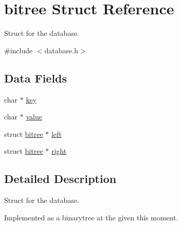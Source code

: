 \hypertarget{structbitree}{\section{bitree Struct Reference}
\label{structbitree}
}


Struct for the database.  




{\ttfamily \#include $<$database.\-h$>$}

\subsection*{Data Fields}
\begin{DoxyCompactItemize}
\item 
char $\ast$ \hyperlink{structbitree_a5892a9181e6a332f84d27aecd41dcd12}{key}
\item 
char $\ast$ \hyperlink{structbitree_a4e9aec275e566b978a3ccb4e043d8c61}{value}
\item 
struct \hyperlink{structbitree}{bitree} $\ast$ \hyperlink{structbitree_a18d65ac734ef7c9a47acebcc1bd95a99}{left}
\item 
struct \hyperlink{structbitree}{bitree} $\ast$ \hyperlink{structbitree_a3874405da5a2a805074d4487d3c67d45}{right}
\end{DoxyCompactItemize}


\subsection{Detailed Description}
Struct for the database. 

Implemented as a binarytree at the given this moment. 

